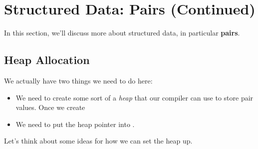 \documentclass[letterpaper]{article}
\begin{document}
\section{Structured Data: Pairs (Continued)}
In this section, we'll discuss more about structured data, in particular \textbf{pairs}.

\subsection{Heap Allocation}
We actually have two things we need to do here: 
\begin{itemize}
    \item We need to create some sort of a \emph{heap} that our compiler can use to store pair values. Once we create 
    \item We need to put the heap pointer into .
\end{itemize}
Let's think about some ideas for how we can set the heap up.
\end{document}
